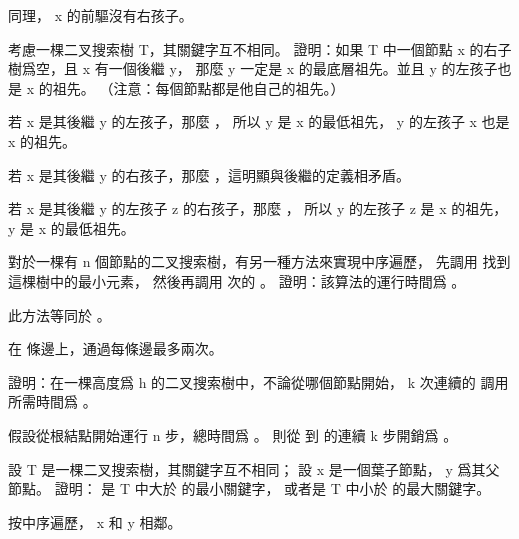 同理， x 的前驅沒有右孩子。
\stopANSWER

\startEXERCISE
考慮一棵二叉搜索樹 T，其關鍵字互不相同。
證明：如果 T 中一個節點 x 的右子樹爲空，且 x 有一個後繼 y，
那麼 y 一定是 x 的最底層祖先。並且 y 的左孩子也是 x 的祖先。
（注意：每個節點都是他自己的祖先。）
\stopEXERCISE

\startANSWER
若 x 是其後繼 y 的左孩子，那麼 ，
所以 y 是 x 的最低祖先， y 的左孩子 x 也是 x 的祖先。

若 x 是其後繼 y 的右孩子，那麼 ，這明顯與後繼的定義相矛盾。

若 x 是其後繼 y 的左孩子 z 的右孩子，那麼 ，
所以 y 的左孩子 z 是 x 的祖先， y 是 x 的最低祖先。
\stopANSWER

\startEXERCISE
對於一棵有 n 個節點的二叉搜索樹，有另一種方法來實現中序遍歷，
先調用  找到這棵樹中的最小元素，
然後再調用  次的 。
證明：該算法的運行時間爲 。
\stopEXERCISE

\startANSWER
此方法等同於 。

在  條邊上，通過每條邊最多兩次。
\stopANSWER

證明：在一棵高度爲 h 的二叉搜索樹中，不論從哪個節點開始，
 k 次連續的  調用所需時間爲 。
\stopEXERCISE

\startANSWER
假設從根結點開始運行 n 步，總時間爲 。
則從  到  的連續 k 步開銷爲 。
\stopANSWER

\startEXERCISE
設 T 是一棵二叉搜索樹，其關鍵字互不相同；
設 x 是一個葉子節點， y 爲其父節點。
證明：  是 T 中大於  的最小關鍵字，
或者是 T 中小於  的最大關鍵字。
\stopEXERCISE

\startANSWER
按中序遍歷， x 和 y 相鄰。
\stopANSWER

\stopsection
